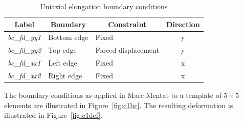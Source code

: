 \begin{table}[H]
\centering
\begin{tabular}{@{}lllc@{}}
\toprule
\multicolumn{1}{c}{\textbf{Label}} & \multicolumn{1}{c}{\textbf{Boundary}} & \multicolumn{1}{c}{\textbf{Constraint}} & \textbf{Direction} \\ \midrule
\textit{bc\_fd\_yy1} & Bottom edge & Fixed               & y \\
\textit{bc\_fd\_yy2} & Top edge    & Forced displacement & y \\
\textit{bc\_fd\_xx1} & Left edge   & Fixed               & x \\
\textit{bc\_fd\_xx2} & Right edge  & Fixed               & x \\ \bottomrule
\end{tabular}
\caption[Uniaxial elongation boundary conditions]{Uniaxial elongation boundary conditions \citep{Kim2015}}
\label{tab:c1}
\end{table}

The boundary conditions as applied in Marc Mentat to a template of $5\times 5$ elements are illustrated in Figure~\ref{fig:c1bc}. The resulting deformation is illustrated in Figure~\ref{fig:c1def}.


